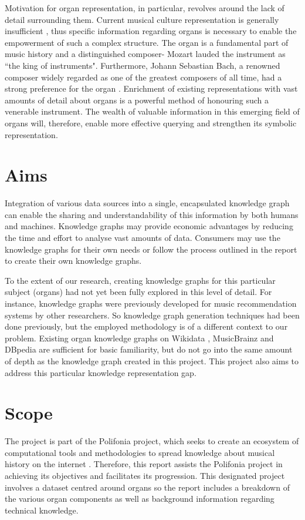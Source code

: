 Motivation for organ representation, in particular, revolves around the lack of detail surrounding them. Current musical culture representation is generally insufficient \cite{polifoniaproject}, thus specific information regarding organs is necessary to enable the empowerment of such a complex structure. The organ is a fundamental part of music history and a distinguished composer- Mozart lauded the instrument as ``the king of instruments". Furthermore, Johann Sebastian Bach, a renowned composer widely regarded as one of the greatest composers of all time, had a strong preference for the organ \cite{wolff2011organs}. Enrichment of existing representations with vast amounts of detail about organs is a powerful method of honouring such a venerable instrument. The wealth of valuable information in this emerging field of organs will, therefore, enable more effective querying and strengthen its symbolic representation. 

\section{Aims}
\hspace{0.5cm} Integration of various data sources into a single, encapsulated knowledge graph can enable the sharing and understandability of this information by both humans and machines. Knowledge graphs may provide economic advantages by reducing the time and effort to analyse vast amounts of data. Consumers may use the knowledge graphs for their own needs or follow the process outlined in the report to create their own knowledge graphs.

To the extent of our research, creating knowledge graphs for this particular subject (organs) had not yet been fully explored in this level of detail. For instance, knowledge graphs were previously developed for music recommendation systems \cite{oramas2016sound} by other researchers. So knowledge graph generation techniques had been done previously, but the employed methodology is of a different context to our problem. Existing organ knowledge graphs on Wikidata \cite{organwikidata}, MusicBrainz \cite{organmusicbrainz} and DBpedia \cite{organdbpedia} are sufficient for basic familiarity, but do not go into the same amount of depth as the knowledge graph created in this project. This project also aims to address this particular knowledge representation gap. 

\section{Scope}
\hspace{0.5cm} The project is part of the Polifonia project, which seeks to create an ecosystem of computational tools and methodologies to spread knowledge about musical history on the internet \cite{polifoniaproject}. Therefore, this report assists the Polifonia project in achieving its objectives and facilitates its progression. This designated project involves a dataset centred around organs so the report includes a breakdown of the various organ components as well as background information regarding technical knowledge. 


